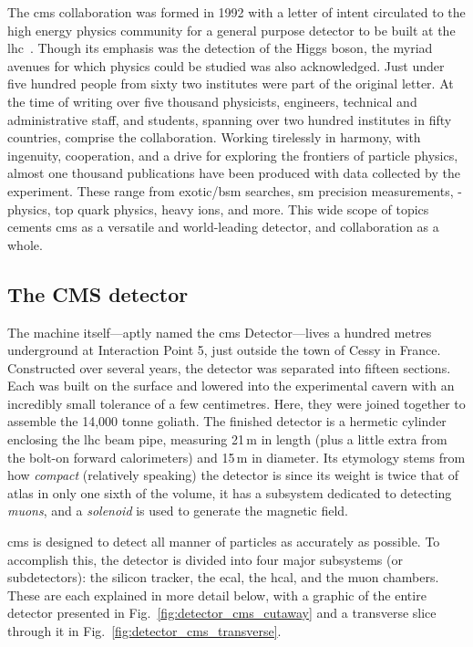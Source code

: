 The \acrfull{cms} collaboration was formed in 1992 with a letter of intent circulated to the high energy physics community for a general purpose detector to be built at the \acrshort{lhc}~\cite{DellaNegra:290808}. Though its emphasis was the detection of the Higgs boson, the myriad avenues for which physics could be studied was also acknowledged. Just under five hundred people from sixty two institutes were part of the original letter. At the time of writing over five thousand physicists, engineers, technical and administrative staff, and students, spanning over two hundred institutes in fifty countries, comprise the collaboration. Working tirelessly in harmony, with ingenuity, cooperation, and a drive for exploring the frontiers of particle physics, almost one thousand publications have been produced with data collected by the experiment. These range from exotic/\acrshort{bsm} searches, \acrlong{sm} precision measurements, \PB-physics, top quark physics, heavy ions, and more. This wide scope of topics cements \acrshort{cms} as a versatile and world-leading detector, and collaboration as a whole.





\subsection{The CMS detector}
\label{subsec:cms_detector_itself}

The machine itself---aptly named the \acrshort{cms} Detector---lives a hundred metres underground at Interaction Point 5, just outside the town of Cessy in France. Constructed over several years, the detector was separated into fifteen sections. Each was built on the surface and lowered into the experimental cavern with an incredibly small tolerance of a few centimetres. Here, they were joined together to assemble the 14,000 tonne goliath. The finished detector is a hermetic cylinder enclosing the \acrshort{lhc} beam pipe, measuring 21\,m in length (plus a little extra from the bolt-on forward calorimeters) and 15\,m in diameter. Its etymology stems from how \emph{compact} (relatively speaking) the detector is since its weight is twice that of \acrshort{atlas} in only one sixth of the volume, it has a subsystem dedicated to detecting \emph{muons}, and a \emph{solenoid} is used to generate the magnetic field.

\acrshort{cms} is designed to detect all manner of particles as accurately as possible. To accomplish this, the detector is divided into four major subsystems (or subdetectors): the silicon tracker, the \acrfull{ecal}, the \acrfull{hcal}, and the muon chambers. These are each explained in more detail below, with a graphic of the entire detector presented in Fig.~\ref{fig:detector_cms_cutaway} and a transverse slice through it in Fig.~\ref{fig:detector_cms_transverse}.

